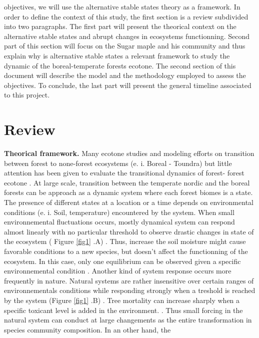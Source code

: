 objectives, we will use the alternative stable states theory as a framework. In
order to define the context of this study, the first section is a review
subdivided into two paragraphs. The first part will present the theorical
context on the alternative stable states and abrupt changes in ecosystems
functionning. Second part of this section will focus on the Sugar maple and his
community and thus explain why is alternative stable states a relevant framework
to study the dynamic of the boreal-temperate forests ecotone.  The second
section of this document will describe the model and the methodology employed to
assess the objectives. To conclude, the last part will present the general
timeline associated to this project. \section{Review}  \textbf{Theorical
framework.}  Many ecotone studies and modeling efforts on transition between
forest to none-forest ecosystems (e. i. Boreal - Toundra)
\cite{Scheffer2012,Scheffer2001,Hirota2011} but little attention has been given
to evaluate the transitional dynamics of forest- forest ecotone
\cite{Goldblum2010,Graignic2013}. At large scale, transition between  the
temperate nordic and the boreal forests can be approach as a dynamic system
where each forest biomes is a state. The presence of different states at a
location or a time depends on environmental conditions (e. i. Soil, temperature)
encountered by the system. When small environnemental fluctuations occurs,
mostly dynamical system can respond almost linearly with no particular threshold
to observe drastic changes in state of the ecosystem ( Figure \ref{fig1} .A)
\cite{Scheffer2001,Scheffer2009}. Thus, increase the soil moisture might cause
favorable conditions to a new species, but doesn't affect the functionning of
the ecosystem. In this case, only one equilibrium can be observed given a
specific environnemental condition
\cite{Scheffer2001,Scheffer2009,scheffer2009critical}. Another kind of system
response occurs more frequently in nature.  Natural systems are rather
insensitive over certain ranges of environnementals conditions while responding
strongly when a treshold is reached by the system (Figure \ref{fig1} .B)
\cite{scheffer2009critical}. Tree mortality can increase sharply when a specific
toxicant level is added in the environment. \cite{scheffer2009critical}. Thus
small forcing in the natural system can conduct at large changements as the
entire transformation in species community composition. In an other hand, the
